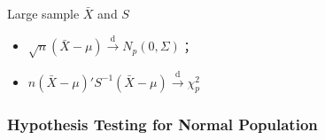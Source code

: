    

\begin{point}
    Large sample $ \bar{X} $ and $ S $
\end{point}
\begin{itemize}[topsep=2pt,itemsep=2pt]
    \item $ \sqrt{n}(\bar{X}-\mu)\xrightarrow[]{\mathrm{d}} N_p(0,\Sigma ) $；
    \item $ n(\bar{X}-\mu)'S ^{-1}(\bar{X}-\mu)\xrightarrow[]{\mathrm{d}} \chi_p^2 $
\end{itemize}

    




\subsubsection{Hypothesis Testing for Normal Population}\label{SubSectionMultivariateHypothesisTesting}
